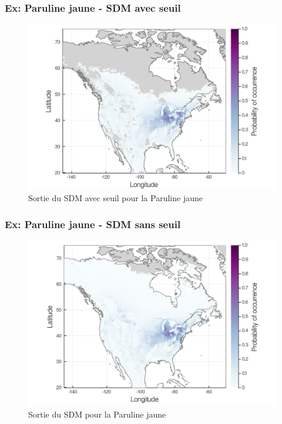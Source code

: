 \documentclass[10pt]{beamer}
\begin{document}
\begin{frame}
  \frametitle{Ex: Paruline jaune - SDM avec seuil}
  \begin{figure}
    \centering
    \hspace*{-0cm}\includegraphics[scale=0.17]{fig/01_sdm_singlesp-threshold.png}
    \caption{Sortie du SDM avec seuil pour la Paruline jaune}
  \end{figure}
\end{frame}

\begin{frame}
  \frametitle{Ex: Paruline jaune - SDM sans seuil}
  \begin{figure}
    \centering
    \hspace*{-0cm}\includegraphics[scale=0.17]{fig/01_sdm_singlesp.png}
    \caption{Sortie du SDM pour la Paruline jaune}
  \end{figure}
\end{frame}
\end{document}
